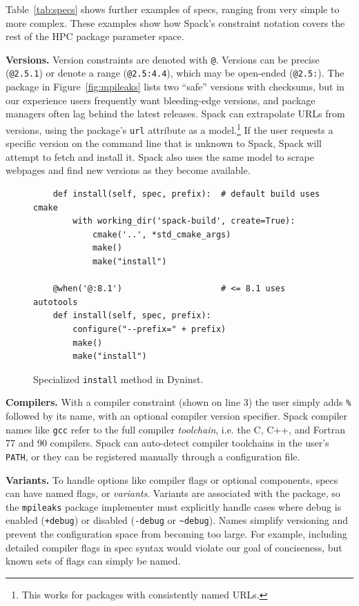 Table~\ref{tab:specs} shows further examples of specs, ranging from very
simple to more complex. These examples show how Spack's constraint
notation covers the rest of the HPC package parameter space.

{\bf Versions.}
Version constraints are denoted with {\tt @}. Versions
can be precise ({\tt @2.5.1}) or denote a range ({\tt @2.5:4.4}),
which may be open-ended ({\tt @2.5:}).
%
The package in Figure~\ref{fig:mpileaks} lists two ``safe'' versions with
checksums, but
in our experience users frequently want bleeding-edge versions, and package managers
often lag behind the latest releases.
Spack can extrapolate URLs from versions,
using the package's {\tt url} attribute as a model.\footnote{This works
for packages with consistently named URLs.}  If the user requests a specific
version on the command line that is unknown to Spack,
Spack will attempt to fetch and install it.  Spack also uses the same
model to scrape webpages and find new versions as they become available.

\begin{figure}
\begin{verbatim}
    def install(self, spec, prefix):  # default build uses cmake
        with working_dir('spack-build', create=True):
            cmake('..', *std_cmake_args)
            make()
            make("install")

    @when('@:8.1')                    # <= 8.1 uses autotools
    def install(self, spec, prefix):
        configure("--prefix=" + prefix)
        make()
        make("install")
\end{verbatim}
\caption{
    Specialized {\tt install} method in Dyninst.
	\label{fig:specialization}
}
\end{figure}

{\bf Compilers.}
With a compiler constraint (shown on line 3) the user
simply adds {\tt \%} followed by its name, with an optional compiler version
specifier.  Spack compiler names like {\tt gcc} refer to the full compiler {\it toolchain},
i.e. the C, C++, and Fortran 77 and 90 compilers.  Spack can auto-detect
compiler toolchains in the user's {\tt PATH}, or they can be registered manually
through a configuration file.

{\bf Variants.}
To handle options like compiler flags or optional components, specs can
have named flags, or {\it variants}.  Variants are associated with the package,
so the {\tt mpileaks} package implementer must explicitly handle cases
where debug is enabled ({\tt +debug}) or disabled ({\tt -debug}
or {\tt \textasciitilde \ignorespaces debug}).  Names simplify versioning
and prevent the configuration space from becoming too large.
For example, including detailed compiler flags in spec syntax
would violate our goal of conciseness, but known sets of flags can simply be named.


